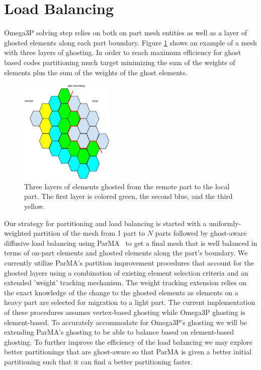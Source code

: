 \documentclass[a4paper]{article}
\begin{document}
\section{Load Balancing}

Omega3P solving step relies on both on part mesh entities as well as a layer of 
ghosted elements along each part boundary. Figure \ref{fig:ghost3} shows an 
example of a mesh with three layers of ghosting. In order to reach maximum efficiency
for ghost based codes partitioning much target minimizing the sum of the 
weights of elements plus the sum of the weights of the ghost elements. 

\begin{figure}[ht]
\centering
\includegraphics[width=0.4\textwidth]{ghostingExample.eps} 
\caption{\label{fig:ghost3} Three layers of elements ghosted from the remote part to the local part.  The first layer is colored green, the second blue, and the third yellow.}
\end{figure}

\noindent Our strategy for partitioning and load balancing is started with a
uniformly-weighted partition of the mesh from 1 part to $N$ parts followed by
ghost-aware diffusive load balancing using ParMA~\cite{SmithParma2015} to get a
final mesh that is well balanced in terms of on-part elements and ghosted
elements along the part's boundary.
We currently utilize ParMA's partition improvement procedures that account for
the ghosted layers using a combination of existing element selection criteria
and an extended 'weight' tracking mechanism.
The weight tracking extension relies on the exact knowledge of the change to the
ghosted elements as elements on a heavy part are selected for migration to a
light part.
The current implementation of these procedures assumes vertex-based ghosting
while Omega3P ghosting is element-based.
To accurately accommodate for Omega3P's ghosting we will be extending ParMA's
ghosting to be able to balance based on element-based ghosting.
To further improve the efficiency of the load balancing we may explore better
partitionings that are ghost-aware so that ParMA is given a better initial
partitioning such that it can find a better partitioning faster.
\end{document}

